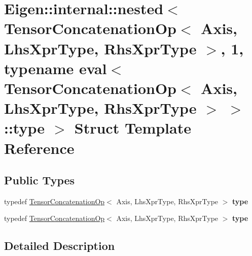 \hypertarget{struct_eigen_1_1internal_1_1nested_3_01_tensor_concatenation_op_3_01_axis_00_01_lhs_xpr_type_00_387f0c29001361c8d2e2fed7054a319e}{}\section{Eigen\+:\+:internal\+:\+:nested$<$ Tensor\+Concatenation\+Op$<$ Axis, Lhs\+Xpr\+Type, Rhs\+Xpr\+Type $>$, 1, typename eval$<$ Tensor\+Concatenation\+Op$<$ Axis, Lhs\+Xpr\+Type, Rhs\+Xpr\+Type $>$ $>$\+:\+:type $>$ Struct Template Reference}
\label{struct_eigen_1_1internal_1_1nested_3_01_tensor_concatenation_op_3_01_axis_00_01_lhs_xpr_type_00_387f0c29001361c8d2e2fed7054a319e}
\subsection*{Public Types}
\begin{DoxyCompactItemize}
\item 
\mbox{\label{struct_eigen_1_1internal_1_1nested_3_01_tensor_concatenation_op_3_01_axis_00_01_lhs_xpr_type_00_387f0c29001361c8d2e2fed7054a319e_a66c0b27956d5298b884dfa72e6584c6d}} 
typedef \hyperlink{class_eigen_1_1_tensor_concatenation_op}{Tensor\+Concatenation\+Op}$<$ Axis, Lhs\+Xpr\+Type, Rhs\+Xpr\+Type $>$ {\bfseries type}
\item 
\mbox{\label{struct_eigen_1_1internal_1_1nested_3_01_tensor_concatenation_op_3_01_axis_00_01_lhs_xpr_type_00_387f0c29001361c8d2e2fed7054a319e_a66c0b27956d5298b884dfa72e6584c6d}} 
typedef \hyperlink{class_eigen_1_1_tensor_concatenation_op}{Tensor\+Concatenation\+Op}$<$ Axis, Lhs\+Xpr\+Type, Rhs\+Xpr\+Type $>$ {\bfseries type}
\end{DoxyCompactItemize}


\subsection{Detailed Description}
